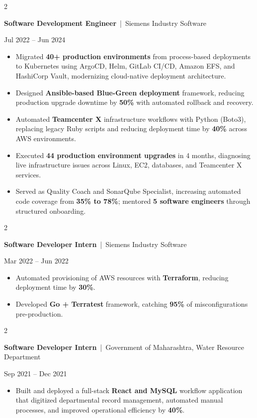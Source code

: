 \documentclass[10pt, letterpaper]{article}
\newenvironment{highlights}{
    \begin{itemize}[
        topsep=0.10 cm,
        parsep=0.06 cm,
        partopsep=0pt,
        itemsep=0.06 cm,
        leftmargin=12pt
    ]
}{
    \end{itemize}
}
\newenvironment{twocolentry}[2][]{
    \onecolentry
    \def\secondColumn{#2}
    \setcolumnwidth{\fill, 4.5 cm}
    \begin{paracol}{2}
}{
    \switchcolumn \raggedleft \secondColumn
    \end{paracol}
    \endonecolentry
}
\begin{document}
\vspace{0.15 cm}

\begin{twocolentry}{Jul 2022 -- Jun 2024}
\textbf{Software Development Engineer} \,|\, Siemens Industry Software
\end{twocolentry}
\begin{highlights}
  \item Migrated \textbf{40+ production environments} from process-based deployments to Kubernetes using ArgoCD, Helm, GitLab CI/CD, Amazon EFS, and HashiCorp Vault, modernizing cloud-native deployment architecture.
  \item Designed \textbf{Ansible-based Blue-Green deployment} framework, reducing production upgrade downtime by \textbf{50\%} with automated rollback and recovery.
  \item Automated \textbf{Teamcenter X} infrastructure workflows with Python (Boto3), replacing legacy Ruby scripts and reducing deployment time by \textbf{40\%} across AWS environments.
  \item Executed \textbf{44 production environment upgrades} in 4 months, diagnosing live infrastructure issues across Linux, EC2, databases, and Teamcenter X services.
  \item Served as Quality Coach and SonarQube Specialist, increasing automated code coverage from \textbf{35\% to 78\%}; mentored \textbf{5 software engineers} through structured onboarding.
\end{highlights}

\vspace{0.15 cm}

\begin{twocolentry}{Mar 2022 -- Jun 2022}
\textbf{Software Developer Intern} \,|\, Siemens Industry Software
\end{twocolentry}
\begin{highlights}
  \item Automated provisioning of AWS resources with \textbf{Terraform}, reducing deployment time by \textbf{30\%}.
  \item Developed \textbf{Go + Terratest} framework, catching \textbf{95\%} of misconfigurations pre-production.
\end{highlights}

\vspace{0.15 cm}

\begin{twocolentry}{Sep 2021 -- Dec 2021}
\textbf{Software Developer Intern} \,|\, Government of Maharashtra, Water Resource Department
\end{twocolentry}
\begin{highlights}
  \item Built and deployed a full-stack \textbf{React and MySQL} workflow application that digitized departmental record management, automated manual processes, and improved operational efficiency by \textbf{40\%}.
\end{highlights}
\end{document}
